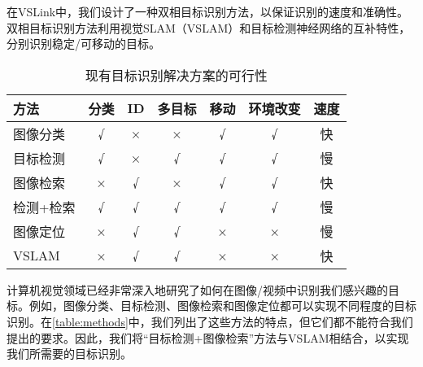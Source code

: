 在VSLink中，我们设计了一种双相目标识别方法，以保证识别的速度和准确性。双相目标识别方法利用视觉SLAM（VSLAM）和目标检测神经网络的互补特性，分别识别稳定/可移动的目标。

\begin{table}[htbp]
	  \centering
	  \caption{\label{table:methods}现有目标识别解决方案的可行性}
	  \begin{tabular}{|l|c|c|c|c|c|c|}\hline
	  方法 &
		分类 &
		ID &
		多目标 &
		移动 &
		环境改变 &
		速度 \\
		\hline 图像分类\cite{he2019bag} &
		{\color[HTML]{355421} √} &
		{\color[HTML]{BF0000} ×} &
		{\color[HTML]{BF0000} ×} &
		{\color[HTML]{355421} √} &
		{\color[HTML]{355421} √} &
		{\color[HTML]{355421} 快} \\ \hline
	  目标检测\cite{zou2019object} &
		{\color[HTML]{355421} √} &
		{\color[HTML]{BF0000} ×} &
		{\color[HTML]{355421} √} &
		{\color[HTML]{355421} √} &
		{\color[HTML]{355421} √} &
		{\color[HTML]{BF0000} 慢} \\ \hline
	  图像检索\cite{philbin2008lost,zheng2017sift} &
		{\color[HTML]{BF0000} ×} &
		{\color[HTML]{355421} √} &
		{\color[HTML]{BF0000} ×} &
		{\color[HTML]{355421} √} &
		{\color[HTML]{355421} √} &
		{\color[HTML]{355421} 快} \\ \hline
	  检测+检索 &
		{\color[HTML]{355421} √} &
		{\color[HTML]{355421} √} &
		{\color[HTML]{355421} √} &
		{\color[HTML]{355421} √} &
		{\color[HTML]{355421} √} &
		{\color[HTML]{BF0000} 慢} \\ \hline
	  图像定位\cite{sattler2011fast} &
		{\color[HTML]{BF0000} ×} &
		{\color[HTML]{355421} √} &
		{\color[HTML]{355421} √} &
		{\color[HTML]{BF0000} ×} &
		{\color[HTML]{BF0000} ×} &
		{\color[HTML]{BF0000} 慢} \\ \hline
	  VSLAM\cite{liu2021edgesharing} &
		{\color[HTML]{BF0000} ×} &
		{\color[HTML]{355421} √} &
		{\color[HTML]{355421} √} &
		{\color[HTML]{BF0000} ×} &
		{\color[HTML]{BF0000} ×} &
		{\color[HTML]{355421} 快} \\ \hline
	  \end{tabular}
	\end{table}
  
计算机视觉领域已经非常深入地研究了如何在图像/视频中识别我们感兴趣的目标。例如，图像分类\cite{he2019bag}、目标检测\cite{zou2019object}、图像检索\cite{philbin2008lost,zheng2017sift}和图像定位\cite{sattler2011fast}都可以实现不同程度的目标识别。在\autoref{table:methods}中，我们列出了这些方法的特点，但它们都不能符合我们提出的要求。因此，我们将“目标检测+图像检索”方法与VSLAM相结合，以实现我们所需要的目标识别。


